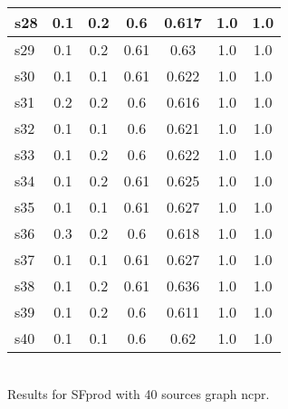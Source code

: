 \documentclass{article}
\begin{document}
\begin{tabular}{|l|c|c|c|c|c|c|}
\hline
s28 &0.1 & 0.2 & 0.6 & 0.617 & 1.0 & 1.0\\
\hline
s29 &0.1 & 0.2 & 0.61 & 0.63 & 1.0 & 1.0\\
\hline
s30 &0.1 & 0.1 & 0.61 & 0.622 & 1.0 & 1.0\\
\hline
s31 &0.2 & 0.2 & 0.6 & 0.616 & 1.0 & 1.0\\
\hline
s32 &0.1 & 0.1 & 0.6 & 0.621 & 1.0 & 1.0\\
\hline
s33 &0.1 & 0.2 & 0.6 & 0.622 & 1.0 & 1.0\\
\hline
s34 &0.1 & 0.2 & 0.61 & 0.625 & 1.0 & 1.0\\
\hline
s35 &0.1 & 0.1 & 0.61 & 0.627 & 1.0 & 1.0\\
\hline
s36 &0.3 & 0.2 & 0.6 & 0.618 & 1.0 & 1.0\\
\hline
s37 &0.1 & 0.1 & 0.61 & 0.627 & 1.0 & 1.0\\
\hline
s38 &0.1 & 0.2 & 0.61 & 0.636 & 1.0 & 1.0\\
\hline
s39 &0.1 & 0.2 & 0.6 & 0.611 & 1.0 & 1.0\\
\hline
s40 &0.1 & 0.1 & 0.6 & 0.62 & 1.0 & 1.0\\
\hline
\end{tabular}\\

\noindent Results for SFprod with 40 sources graph ncpr.
\end{document}
